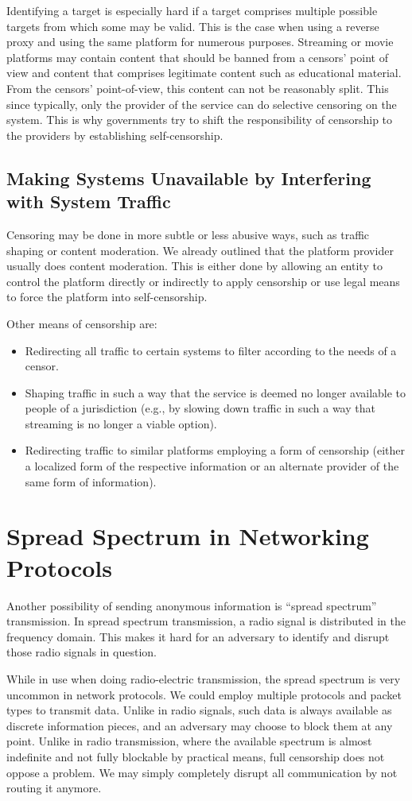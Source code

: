 Identifying a target is especially hard if a target comprises multiple possible targets from which some may be valid. This is the case when using a reverse proxy and using the same platform for numerous purposes. Streaming or movie platforms may contain content that should be banned from a censors' point of view and content that comprises legitimate content such as educational material. From the censors' point-of-view, this content can not be reasonably split. This since typically, only the provider of the service can do selective censoring on the system. This is why governments try to shift the responsibility of censorship to the providers by establishing self-censorship. 

\subsection{Making Systems Unavailable by Interfering with System Traffic}
Censoring may be done in more subtle or less abusive ways, such as traffic shaping or content moderation. We already outlined that the platform provider usually does content moderation. This is either done by allowing an entity to control the platform directly or indirectly to apply censorship or use legal means to force the platform into self-censorship.

Other means of censorship are:
\begin{itemize}
	\item Redirecting all traffic to certain systems to filter according to the needs of a censor.
	\item Shaping traffic in such a way that the service is deemed no longer available to people of a jurisdiction (e.g., by slowing down traffic in such a way that streaming is no longer a viable option).
	\item Redirecting traffic to similar platforms employing a form of censorship (either a localized form of the respective information or an alternate provider of the same form of information).
\end{itemize}

\section{Spread Spectrum in Networking Protocols}
Another possibility of sending anonymous information is ``spread spectrum'' transmission. In spread spectrum transmission, a radio signal is distributed in the frequency domain. This makes it hard for an adversary to identify and disrupt those radio signals in question. 

While in use when doing radio-electric transmission, the spread spectrum is very uncommon in network protocols. We could employ multiple protocols and packet types to transmit data. Unlike in radio signals, such data is always available as discrete information pieces, and an adversary may choose to block them at any point. Unlike in radio transmission, where the available spectrum is almost indefinite and not fully blockable by practical means, full censorship does not oppose a problem. We may simply completely disrupt all communication by not routing it anymore.

